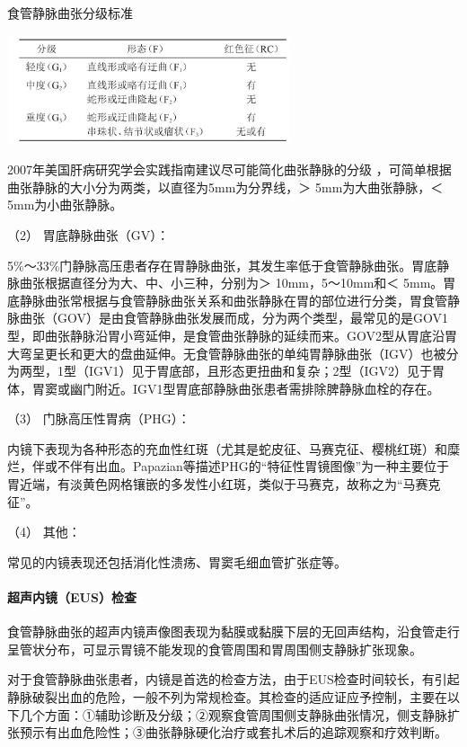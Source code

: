 \begin{table}[htbp]
\centering
\caption{食管静脉曲张分级标准}
\label{tab116-1}
\includegraphics[width=3.29167in,height=1.27083in]{./images/Image00489.jpg}
\end{table}

2007年美国肝病研究学会实践指南建议尽可能简化曲张静脉的分级
，可简单根据曲张静脉的大小分为两类，以直径为5mm为分界线，＞
5mm为大曲张静脉，＜ 5mm为小曲张静脉。

\hypertarget{text00328.htmlux5cux23CHP11-7-1-2-2-5-2}{}
（2） 胃底静脉曲张（GV）：

5\%～33\%门静脉高压患者存在胃静脉曲张，其发生率低于食管静脉曲张。胃底静脉曲张根据直径分为大、中、小三种，分别为＞
10mm，5～10mm和＜
5mm。胃底静脉曲张常根据与食管静脉曲张关系和曲张静脉在胃的部位进行分类，胃食管静脉曲张（GOV）是由食管静脉曲张发展而成，分为两个类型，最常见的是GOV1型，即曲张静脉沿胃小弯延伸，是食管曲张静脉的延续而来。GOV2型从胃底沿胃大弯呈更长和更大的盘曲延伸。无食管静脉曲张的单纯胃静脉曲张（IGV）也被分为两型，1型（IGV1）见于胃底部，且形态更扭曲和复杂；2型（IGV2）见于胃体，胃窦或幽门附近。IGV1型胃底部静脉曲张患者需排除脾静脉血栓的存在。

\hypertarget{text00328.htmlux5cux23CHP11-7-1-2-2-5-3}{}
（3） 门脉高压性胃病（PHG）：

内镜下表现为各种形态的充血性红斑（尤其是蛇皮征、马赛克征、樱桃红斑）和糜烂，伴或不伴有出血。Papazian等描述PHG的“特征性胃镜图像”为一种主要位于胃近端，有淡黄色网格镶嵌的多发性小红斑，类似于马赛克，故称之为“马赛克征”。

\hypertarget{text00328.htmlux5cux23CHP11-7-1-2-2-5-4}{}
（4） 其他：

常见的内镜表现还包括消化性溃疡、胃窦毛细血管扩张症等。

\paragraph{超声内镜（EUS）检查}

食管静脉曲张的超声内镜声像图表现为黏膜或黏膜下层的无回声结构，沿食管走行呈管状分布，可显示胃镜不能发现的食管周围和胃周围侧支静脉扩张现象。

对于食管静脉曲张患者，内镜是首选的检查方法，由于EUS检查时间较长，有引起静脉破裂出血的危险，一般不列为常规检查。其检查的适应证应予控制，主要在以下几个方面：①辅助诊断及分级；②观察食管周围侧支静脉曲张情况，侧支静脉扩张预示有出血危险性；③曲张静脉硬化治疗或套扎术后的追踪观察和疗效判断。

